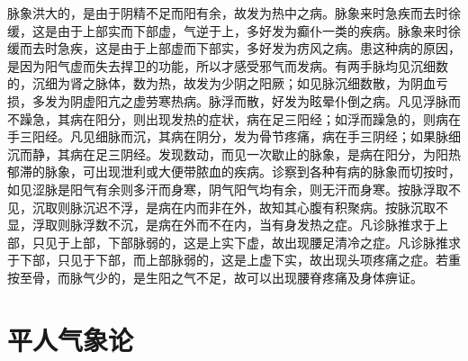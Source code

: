 \documentclass[12pt,UTF8]{ctexbook}
\begin{document}
脉象洪大的，是由于阴精不足而阳有余，故发为热中之病。脉象来时急疾而去时徐缓，这是由于上部实而下部虚，气逆于上，多好发为癫仆一类的疾病。脉象来时徐缓而去时急疾，这是由于上部虚而下部实，多好发为疠风之病。患这种病的原因，是因为阳气虚而失去捍卫的功能，所以才感受邪气而发病。有两手脉均见沉细数的，沉细为肾之脉体，数为热，故发为少阴之阳厥；如见脉沉细数散，为阴血亏损，多发为阴虚阳亢之虚劳寒热病。脉浮而散，好发为眩晕仆倒之病。凡见浮脉而不躁急，其病在阳分，则出现发热的症状，病在足三阳经；如浮而躁急的，则病在手三阳经。凡见细脉而沉，其病在阴分，发为骨节疼痛，病在手三阴经；如果脉细沉而静，其病在足三阴经。发现数动，而见一次歇止的脉象，是病在阳分，为阳热郁滞的脉象，可出现泄利或大便带脓血的疾病。诊察到各种有病的脉象而切按时，如见涩脉是阳气有余则多汗而身寒，阴气阳气均有余，则无汗而身寒。按脉浮取不见，沉取则脉沉迟不浮，是病在内而非在外，故知其心腹有积聚病。按脉沉取不显，浮取则脉浮数不沉，是病在外而不在内，当有身发热之症。凡诊脉推求于上部，只见于上部，下部脉弱的，这是上实下虚，故出现腰足清冷之症。凡诊脉推求于下部，只见于下部，而上部脉弱的，这是上虚下实，故出现头项疼痛之症。若重按至骨，而脉气少的，是生阳之气不足，故可以出现腰脊疼痛及身体痹证。

\chapter{平人气象论}
\end{document}
